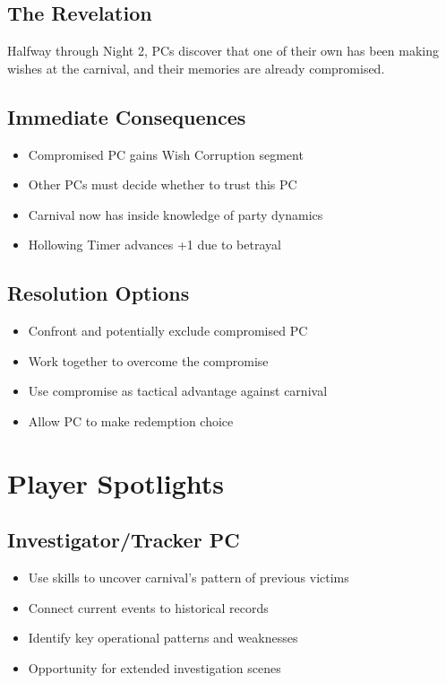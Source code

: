 \documentclass[11pt]{article}
\begin{document}
\subsection{The Revelation}
Halfway through Night 2, PCs discover that one of their own has been making wishes at the carnival, and their memories are already compromised.

\subsection{Immediate Consequences}
\begin{itemize}
\item Compromised PC gains Wish Corruption segment
\item Other PCs must decide whether to trust this PC
\item Carnival now has inside knowledge of party dynamics
\item Hollowing Timer advances +1 due to betrayal
\end{itemize}

\subsection{Resolution Options}
\begin{itemize}
\item Confront and potentially exclude compromised PC
\item Work together to overcome the compromise
\item Use compromise as tactical advantage against carnival
\item Allow PC to make redemption choice
\end{itemize}

\section{Player Spotlights}

\subsection{Investigator/Tracker PC}
\begin{itemize}
\item Use skills to uncover carnival's pattern of previous victims
\item Connect current events to historical records
\item Identify key operational patterns and weaknesses
\item Opportunity for extended investigation scenes
\end{itemize}
\end{document}
